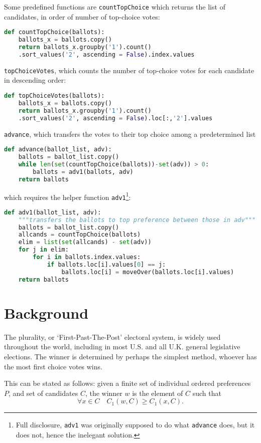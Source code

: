 \documentclass{article}
\begin{document}
Some predefined functions are \texttt{countTopChoice} which returns the list of candidates, in order of number of top-choice votes:
\begin{lstlisting}[language = Python]
def countTopChoice(ballots):
    ballots_x = ballots.copy()
    return ballots_x.groupby('1').count()
    .sort_values('2', ascending = False).index.values
\end{lstlisting}
\texttt{topChoiceVotes}, which counts the number of top-choice votes for each candidate in descending order:
\begin{lstlisting}[language = Python]
def topChoiceVotes(ballots):
    ballots_x = ballots.copy()
    return ballots_x.groupby('1').count()
    .sort_values('2', ascending = False).loc[:,'2'].values
\end{lstlisting}
\texttt{advance}, which transfers the votes to their top choice among a predetermined list 
\begin{lstlisting}[language = Python]
def advance(ballot_list, adv):
    ballots = ballot_list.copy()
    while len(set(countTopChoice(ballots))-set(adv)) > 0:
        ballots = adv1(ballots, adv)
    return ballots
\end{lstlisting}
which requires the helper function \texttt{adv1}\footnote{Full disclosure, \texttt{adv1} was originally supposed to do what \texttt{advance} does, but it does not, hence the inelegant solution.}:
\begin{lstlisting}[language = Python]
def adv1(ballot_list, adv):
    """transfers the ballots to top preference between those in adv"""
    ballots = ballot_list.copy()
    allcands = countTopChoice(ballots)
    elim = list(set(allcands) - set(adv))
    for j in elim:
        for i in ballots.index.values:
            if ballots.loc[i].values[0] == j:
                ballots.loc[i] = moveOver(ballots.loc[i].values)
    return ballots
\end{lstlisting}

\section{Background}

The plurality, or `First-Past-The-Post' electoral system, is widely used throughout the world, including in most U.S. and all U.K. general legislative elections. The winner is determined by perhaps the simplest method, whoever has the most first choice votes wins.

This can be stated as follows: given a finite set of individual ordered preferences $P$, and set of candidates $C$, the winner $w$ is the element of $C$ such that
$$\forall x \in C \quad C_1(w,C) \geq C_1(x,C).$$
\end{document}
